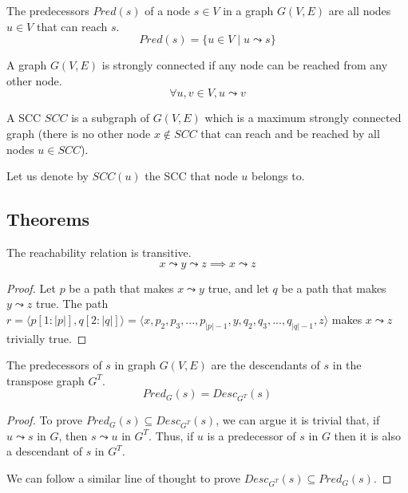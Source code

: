 \begin{definition}[Predecessors] The predecessors $Pred(s)$ of a node $s \in V$ in a graph $G(V,E)$ are all nodes $u \in V$ that can reach $s$.
    \begin{equation*}
        Pred(s) = \{u \in V \mid u \leadsto s\}
    \end{equation*}
\end{definition}
\begin{definition}
    A graph $G(V, E)$ is strongly connected if any node can be reached from any other node.
    \begin{equation*}
        \forall u, v \in V, u \leadsto v
    \end{equation*}
\end{definition}
\begin{definition}
    A \acrlong*{SCC} $SCC$ is a subgraph of $G(V, E)$ which is a maximum strongly connected graph (there is no other node $x \not \in SCC$ that can reach and be reached by all nodes $u \in SCC$).
\end{definition}
Let us denote by $SCC(u)$ the \acrfull{SCC} that node $u$ belongs to.
\subsection{Theorems}
\begin{theorem}
    The reachability relation is transitive.
    \begin{equation*}
        x \leadsto y \leadsto z \implies x \leadsto z
    \end{equation*}
\end{theorem}
\begin{proof}
Let $p$ be a path that makes $x \leadsto y$ true, and let $q$ be a path that makes $y \leadsto z$ true. The path $r = \langle p[1:|p|], q[2:|q|] \rangle = \langle x, p_2, p_3,...,p_{|p|-1},y,q_2,q_3,...,q_{|q|-1}, z \rangle$ makes $x \leadsto z$ trivially true.
\end{proof}

\begin{theorem} \label{theor:pred-desc}
    The predecessors of $s$ in graph $G(V,E)$ are the descendants of $s$ in the transpose graph $G^T$.
    \begin{equation*}
        Pred_{G}(s)=Desc_{G^T}(s)
    \end{equation*}
\end{theorem}
\begin{proof}
    To prove $Pred_G(s) \subseteq Desc_{G^T}(s)$, we can argue it is trivial that, if $u \leadsto s$ in $G$, then $s \leadsto u$ in $G^T$. Thus, if $u$ is a predecessor of $s$ in $G$ then it is also a descendant of $s$ in $G^T$.\par
    We can follow a similar line of thought to prove $Desc_{G^T}(s) \subseteq Pred_G(s)$.
\end{proof}


